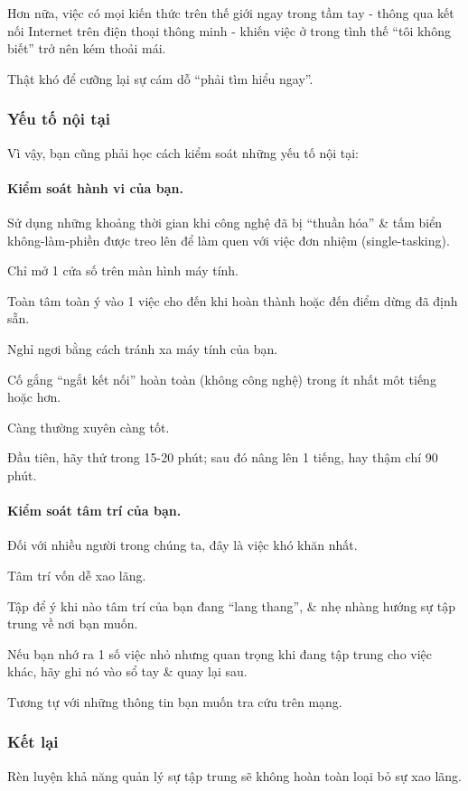 \documentclass{article}
\begin{document}
%
Hơn nữa, việc có mọi kiến thức trên thế giới ngay trong tầm tay - thông qua kết nối Internet trên điện thoại thông minh - khiến việc ở trong tình thế ``tôi không biết'' trở nên kém thoải mái.

Thật khó để cưỡng lại sự cám dỗ ``phải tìm hiểu ngay''.

\subsubsection{Yếu tố nội tại}
Vì vậy, bạn cũng phải học cách kiểm soát những yếu tố nội tại:

\paragraph{Kiểm soát hành vi của bạn.} Sử dụng những khoảng thời gian khi công nghệ đã bị ``thuần hóa'' \& tấm biển không-làm-phiền được treo lên để làm quen với việc đơn nhiệm (single-tasking).

Chỉ mở 1 cửa số trên màn hình máy tính.

Toàn tâm toàn ý vào 1 việc cho đến khi hoàn thành hoặc đến điểm dừng đã định sẵn.

Nghỉ ngơi bằng cách tránh xa máy tính của bạn.

Cố gắng ``ngắt kết nối'' hoàn toàn (không công nghệ) trong ít nhất môt tiếng hoặc hơn.

Càng thường xuyên càng tốt.

Đầu tiên, hãy thử trong 15-20 phút; sau đó nâng lên 1 tiếng, hay thậm chí 90 phút.

\paragraph{Kiểm soát tâm trí của bạn.} Đối với nhiều người trong chúng ta, đây là việc khó khăn nhất.

Tâm trí vốn dễ xao lãng.

Tập để ý khi nào tâm trí của bạn đang ``lang thang'', \& nhẹ nhàng hướng sự tập trung về nơi bạn muốn.

Nếu bạn nhớ ra 1 số việc nhỏ nhưng quan trọng khi đang tập trung cho việc khác, hãy ghi nó vào sổ tay \& quay lại sau.

Tương tự với những thông tin bạn muốn tra cứu trên mạng.

\subsubsection{Kết lại}
Rèn luyện khả năng quản lý sự tập trung sẽ không hoàn toàn loại bỏ sự xao lãng.
\end{document}
